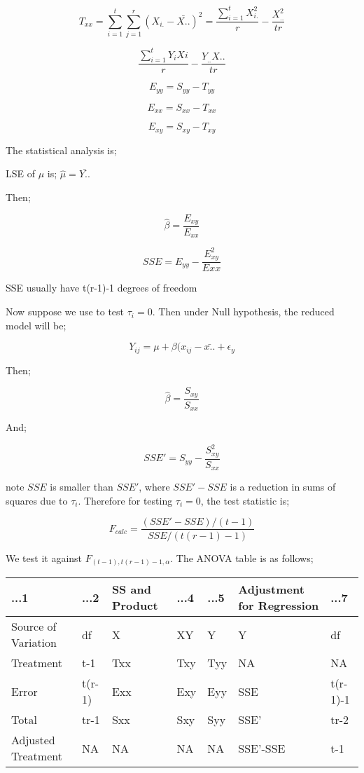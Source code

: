 \documentclass[
]{article}
\begin{document}
\[T_{xx}=\sum_{i=1}^t\sum_{j=1}^r(X_{i.}-\bar{X..})^2=\frac{\sum_{i=1}^tX_{i.}^2}{r}-\frac{X_{..}^2}{tr}\]

\[\frac{\sum_{i=1}^tY_{i}Xi}{r}-\frac{Y_{..}X..}{tr}\]

\[E_{yy}=S_{yy}-T_{yy}\]

\[E_{xx}=S_{xx}-T_{xx}\]

\[E_{xy}=S_{xy}-T_{xy}\]

The statistical analysis is;

LSE of \(\mu\) is; \(\hat{\mu}=\bar{Y..}\)

Then;

\[\hat{\beta}=\frac{E_{xy}}{E_{xx}}\]

\[SSE = E_{yy} - \frac{E_{xy}^2}{Exx}\]

SSE usually have t(r-1)-1 degrees of freedom

Now suppose we use to test \(\tau_i=0\). Then under Null hypothesis, the
reduced model will be;

\[Y_{ij} = \mu+\beta(x_{ij}-\bar{x..} + \epsilon_{y}\]

Then;

\[\hat{\beta}=\frac{S_{xy}}{S_{xx}}\]

And;

\[SSE' = S_{yy}-\frac{S_{xy}^2}{S_{xx}}\]

note \(SSE\) is smaller than \(SSE'\), where \(SSE'-SSE\) is a reduction
in sums of squares due to \(\tau_i\). Therefore for testing
\(\tau_i=0\), the test statistic is;

\[F_{calc}=\frac{(SSE'-SSE)/(t-1)}{SSE/(t(r-1)-1)}\]

We test it against \(F_{(t-1),t(r-1)-1,\alpha}\). The ANOVA table is as
follows;

\begin{tabular}{l|l|l|l|l|l|l}
\hline
...1 & ...2 & SS and Product & ...4 & ...5 & Adjustment for Regression & ...7\\
\hline
Source of Variation & df & X & XY & Y & Y & df\\
\hline
Treatment & t-1 & Txx & Txy & Tyy & NA & NA\\
\hline
Error & t(r-1) & Exx & Exy & Eyy & SSE & t(r-1)-1\\
\hline
Total & tr-1 & Sxx & Sxy & Syy & SSE' & tr-2\\
\hline
Adjusted Treatment & NA & NA & NA & NA & SSE'-SSE & t-1\\
\hline
\end{tabular}

\newpage
\end{document}
